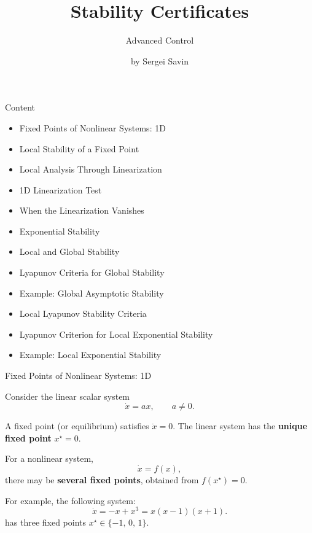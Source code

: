 \documentclass{beamer}
\title{Stability Certificates}
\subtitle{Advanced Control}
\author{by Sergei Savin}
\date{\mydate}
\begin{document}
\maketitle


\begin{frame}{Content}
\begin{itemize}
	\item Fixed Points of Nonlinear Systems: 1D
	\item Local Stability of a Fixed Point
	\item Local Analysis Through Linearization
	\item 1D Linearization Test
	\item When the Linearization Vanishes
	\item Exponential Stability
	\item Local and Global Stability
	\item Lyapunov Criteria for Global Stability
	\item Example: Global Asymptotic Stability
	\item Local Lyapunov Stability Criteria
	\item Lyapunov Criterion for Local Exponential Stability
	\item Example: Local Exponential Stability
\end{itemize}

\end{frame}




\begin{frame}{Fixed Points of Nonlinear Systems: 1D}
	\begin{flushleft}
	Consider the linear scalar system
	\[
	\dot{x} = ax, \qquad a \neq 0.
	\]
	
	A fixed point (or equilibrium) satisfies $	\dot{x} = 0$. The linear system has the \textbf{unique fixed point} $x^\star = 0$.
	
	\bigskip
	
	For a nonlinear system,
	\[
	\dot{x} = f(x),
	\]
	there may be \textbf{several fixed points}, obtained from $f(x^\star)=0$. 
	
	
	\bigskip
	

	For example, the following system:
		\[
		\dot{x} = -x+x^3 = x(x-1)(x+1).
		\]
	    has three fixed points $x^\star \in \{-1,\,0,\,1\}$.

	
	\end{flushleft}
\end{frame}
\end{document}
